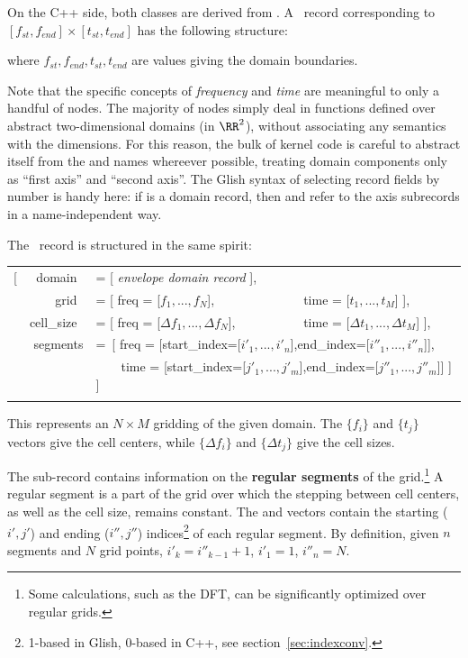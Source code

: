   On the C++ side, both classes are derived from . A \Domain\ 
  record corresponding to $[f_{st},f_{end}]\times[t_{st},t_{end}]$ has the following structure:
  
  \qq{[ freq = [ $f_{st},f_{end}$ ], time = [ $t_{st},t_{end}$ ] ]}
  
  where $f_{st},f_{end},t_{st},t_{end}$ are  values giving the domain
  boundaries.

  Note that the specific concepts of {\em frequency} and {\em time} are
  meaningful to only a handful of nodes. The majority of nodes simply deal in
  functions defined over abstract two-dimensional domains (in $\RR^2$), without
  associating any semantics with the dimensions. For this reason, the bulk of
  kernel code is careful to abstract itself from the \qq{freq} and \qq{time}
  names whereever possible, treating domain components only as ``first axis''
  and ``second axis''. The Glish syntax of selecting record fields by number is
  handy here: if \qq{dom} is a domain record, then \qq{dom[1]} and \qq{dom[2]}
  refer to the axis subrecords in a name-independent way.

  The \Cells\ record is structured in the same spirit:
  
  {\tt\begin{center}\begin{tabular}{lrl@{}l}
  [ &domain~&     = [ {\em envelope domain record} ],\\
    &grid~&       = [ freq = [$f_1,...,f_N$],~&~time = [$t_1,...,t_M$] ],\\
    &cell\_size~& = [ freq = [$\Delta f_1,...,\Delta f_N$],~&~time = 
                              [$\Delta t_1,...,\Delta t_M$] ],\\
    &segments&\multicolumn{2}{l}{=~[ freq =
    [start\_index=[$i'_1,...,i'_n$],end\_index=[$i''_1,...,i''_n$]],}\\
              &&\multicolumn{2}{l}{~~~~time =
              [start\_index=[$j'_1,...,j'_m$],end\_index=[$j''_1,...,j''_m$]] ] ]}\\
  \\ 
  \end{tabular}\end{center}}
  
  This represents an $N\times M$ gridding of the given domain. The $\{f_i\}$ and
  $\{t_j\}$ vectors give the cell centers, while $\{\Delta f_i\}$ and $\{\Delta
  t_j\}$ give the cell sizes. 
  
  The  sub-record contains information on the {\bf regular
  segments} of the grid.\footnote{Some calculations, such as the DFT, can be
  significantly optimized over regular grids.} A regular segment is a part of
  the grid over which the stepping between cell centers, as well as the cell
  size, remains constant. The \qq{start\_index} and \qq{end\_index} vectors
  contain the starting ($i',j'$) and ending ($i'',j''$)
  indices\footnote{1-based in Glish, 0-based in C++, see
  section~\ref{sec:indexconv}.} of each regular segment.
  By definition, given $n$ segments and $N$ grid points, $i'_{k}= i''_{k-1}+1$,
  $i'_1=1$, $i''_n=N.$

